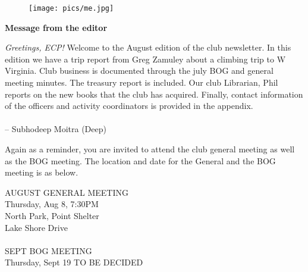 \documentclass[10pt,a4paper]{article}
\newcommand{\NewsItem}[1]{%
		\usefont{T1}{augie}{m}{n} 	
		\large \bf #1 \vspace{4pt}
		\par \normalsize \normalfont}
\begin{document}
 

\begin{center}
\begin{minipage}[h]{0.8\linewidth}
	\begin{wrapfigure}{l}{0.41\textwidth}
		\texttt{[image: pics/me.jpg]}
		\\%
	\end{wrapfigure}
	
	\NewsItem{Message from the editor}

	\emph{Greetings, ECP!} Welcome to the August edition of the club newsletter. In this edition we have a trip report from Greg Zamuley about a climbing trip to W Virginia. Club business is documented through the july BOG and general meeting minutes. The treasury report is included. Our club Librarian, Phil reports on the new books that the club has acquired. Finally, contact information of the officers and activity coordinators is provided in the appendix. 
\\
\\
-- Subhodeep Moitra (Deep)

\vspace{0.5cm}



	Again as a reminder, you are invited to attend the club general meeting as well as the BOG meeting. The location and date for the General and the BOG meeting is as below.
	
\vspace{1cm}

\begin{multicols}{2}
\Large


AUGUST GENERAL MEETING\\
Thursday, Aug 8, 7:30PM\\
North Park, Point Shelter\\
Lake Shore Drive\\
\\
SEPT BOG MEETING\\
Thursday, Sept 19
TO BE DECIDED


\normalsize
\end{multicols}
	
\end{minipage}
\end{center}

\pagebreak
\clearpage
\end{document}
